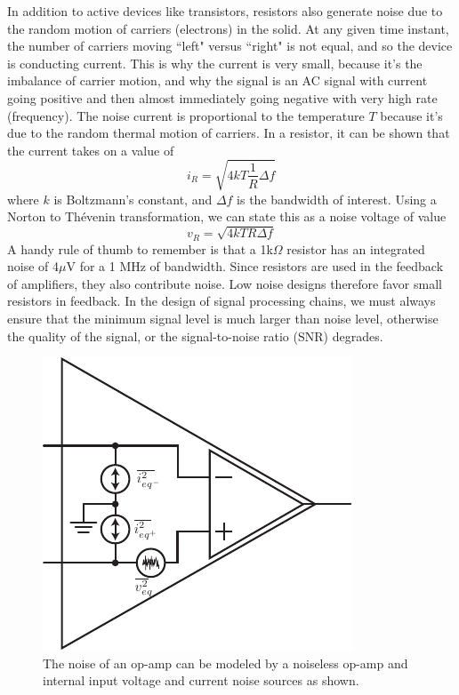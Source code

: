 In addition to active devices like transistors, resistors also generate noise due to the random motion of carriers (electrons) in the solid.  At any given time instant, the number of carriers moving ``left" versus ``right" is not equal, and so the device is conducting current. This is why the current is very small, because it's the imbalance of carrier motion, and why the signal is an AC signal with current going positive and then almost immediately going negative with very high rate (frequency).  The noise current is proportional to the temperature $T$ because it's due to the random thermal motion of carriers.  In a resistor, it can be shown that the current takes on a value of
\begin{equation}
	i_R = \sqrt{4 k T \frac{1}{R} \Delta f} 
\end{equation}
where $k$ is Boltzmann's constant, and $\Delta f$ is the bandwidth of interest.   Using a Norton to Thévenin transformation, we can state this as a noise voltage of value
\begin{equation}
	v_R = \sqrt{4 k T R \Delta f} 
\end{equation}
A handy rule of thumb to remember is that a 1k$\Omega$ resistor has an integrated noise of 4$\mu$V for a 1 MHz of bandwidth.   Since resistors are used in the feedback of amplifiers, they also contribute noise. Low noise designs therefore favor small resistors in feedback.  In the design of signal processing chains, we must always ensure that the minimum signal level is much larger than noise level, otherwise the quality of the signal, or the signal-to-noise ratio (SNR) degrades.
\begin{figure}[tb]
\begin{center}
\includegraphics[scale=1]{opamp_noise}
\end{center}
\caption{The noise of an op-amp can be modeled by a noiseless op-amp and internal input voltage and current noise sources as shown.}
\label{fig:opamp_noise}
\end{figure}
